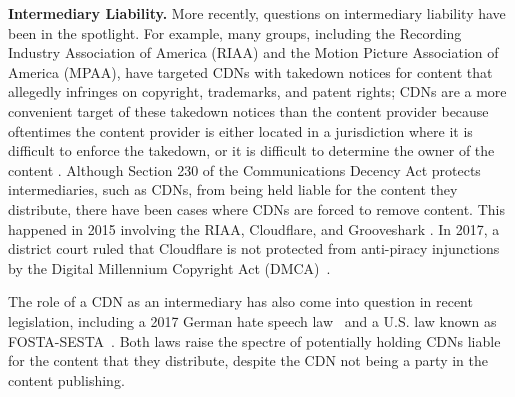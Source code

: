 \textbf{Intermediary Liability.}
More recently, questions on intermediary liability have been in the spotlight.  For example, many groups, including the Recording Industry 
Association of America (RIAA) and the Motion Picture Association of America (MPAA), have targeted CDNs with takedown notices for 
content that allegedly infringes on copyright, trademarks, and patent rights; CDNs are a more convenient target of these takedown notices than 
the content provider because oftentimes the content provider is either located in a jurisdiction where it is difficult to enforce the takedown, 
or it is difficult to determine the owner of the content \cite{medium_copyright,eff_copyright}.
Although Section 230 of the Communications Decency Act protects intermediaries,
such as CDNs, from being held
liable for the content they distribute, there have been cases where CDNs are forced
to remove content.  This happened in 2015 involving the RIAA, Cloudflare, and Grooveshark \cite{techdirt_copyright}. In 2017, a district court ruled that Cloudflare is not protected from anti-piracy injunctions by the Digital Millennium Copyright Act (DMCA)~\cite{stack_copyright}.

The role of a CDN as an intermediary has also come into question in recent legislation, including a 2017 German hate speech law~\cite{netenforementact} and a U.S. law known as FOSTA-SESTA~\cite{fosta_sesta}. Both laws raise the spectre of potentially holding CDNs liable for the content that they distribute, despite the CDN not being a party in the content publishing.

